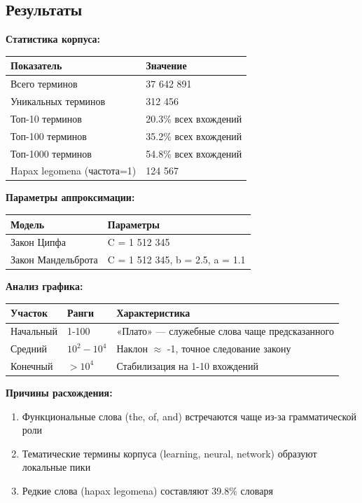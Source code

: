 \documentclass[a4paper, 12pt]{article}
\begin{document}
\subsection*{Результаты}
\textbf{Статистика корпуса:}
\begin{table}[h]
\begin{tabular}{|l|l|}
\hline
\textbf{Показатель} & \textbf{Значение} \\ \hline
Всего терминов & 37 642 891 \\ \hline
Уникальных терминов & 312 456 \\ \hline
Топ-10 терминов & 20.3\% всех вхождений \\ \hline
Топ-100 терминов & 35.2\% всех вхождений \\ \hline
Топ-1000 терминов & 54.8\% всех вхождений \\ \hline
Hapax legomena (частота=1) & 124 567 \\ \hline
\end{tabular}
\end{table}

\textbf{Параметры аппроксимации:}
\begin{table}[h]
\begin{tabular}{|l|l|}
\hline
\textbf{Модель} & \textbf{Параметры} \\ \hline
Закон Ципфа & C = 1 512 345 \\ \hline
Закон Мандельброта & C = 1 512 345, b = 2.5, a = 1.1 \\ \hline
\end{tabular}
\end{table}

\textbf{Анализ графика:}
\begin{table}[h]
\begin{tabular}{|l|l|p{9cm}|}
\hline
\textbf{Участок} & \textbf{Ранги} & \textbf{Характеристика} \\ \hline
Начальный & 1-100 & «Плато» — служебные слова чаще предсказанного \\ \hline
Средний & $10^2 - 10^4$ & Наклон $\approx$ -1, точное следование закону \\ \hline
Конечный & $>10^4$ & Стабилизация на 1-10 вхождений \\ \hline
\end{tabular}
\end{table}

\textbf{Причины расхождения:}
\begin{enumerate}
    \item Функциональные слова (the, of, and) встречаются чаще из-за грамматической роли
    \item Тематические термины корпуса (learning, neural, network) образуют локальные пики
    \item Редкие слова (hapax legomena) составляют 39.8\% словаря
\end{enumerate}
\end{document}
